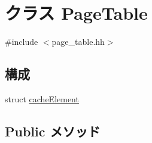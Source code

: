 \hypertarget{classPageTable}{
\section{クラス PageTable}
\label{classPageTable}
}


{\ttfamily \#include $<$page\_\-table.hh$>$}\subsection*{構成}
\begin{DoxyCompactItemize}
\item 
struct \hyperlink{structPageTable_1_1cacheElement}{cacheElement}
\end{DoxyCompactItemize}
\subsection*{Public メソッド}
